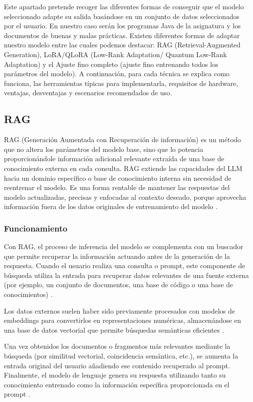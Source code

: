 Este apartado pretende recoger las diferentes formas de conseguir que el modelo seleccionado adapte su salida basándose en un conjunto de datos seleccionados por el usuario. En nuestro caso serán los programas Java de la asignatura y los documentos de buenas y malas prácticas. Existen diferentes formas de adaptar nuestro modelo entre las cuales podemos destacar:  RAG (Retrieval-Augmented Generation), LoRA/QLoRA (Low-Rank Adaptation/ Quantum  Low-Rank Adaptation) y el Ajuste fino completo (ajuste fino entrenando todos los parámetros del modelo). A continuación, para cada técnica se explica como  funciona, las herramientas típicas para implementarla, requisitos de hardware, ventajas, desventajas y escenarios recomendados de uso.

\subsection{RAG}
RAG (Generación Aumentada con Recuperación de información) es un método que no altera los parámetros del modelo base, sino que lo potencia proporcionándole información adicional relevante extraída de una base de conocimiento externa en cada consulta. RAG extiende las capacidades del LLM hacia un dominio específico o base de conocimiento interna sin necesidad de reentrenar el modelo. Es una forma rentable de mantener las respuestas del modelo actualizadas, precisas y enfocadas al contexto deseado, porque aprovecha información fuera de los datos originales de entrenamiento del modelo \cite{RAG-Amazon}.

\subsubsection{Funcionamiento}
Con RAG, el proceso de inferencia del modelo se complementa con un buscador que permite recuperar la información actuando antes de la generación de la respuesta. Cuando el usuario realiza una consulta o prompt, este componente de búsqueda utiliza la entrada para recuperar datos relevantes de una fuente externa (por ejemplo, un conjunto de documentos, una base de código o una base de conocimientos) \cite{RAG-Amazon}.

Los datos externos suelen haber sido previamente procesados con modelos de embeddings para convertirlos en representaciones numéricas, almacenándose en una base de datos vectorial que permite búsquedas semánticas eficientes \cite{RAG-Amazon}.

Una vez obtenidos los documentos o fragmentos más relevantes mediante la búsqueda (por similitud vectorial, coincidencia semántica, etc.), se aumenta la entrada original del usuario añadiendo ese contenido recuperado al prompt. Finalmente, el modelo de lenguaje genera su respuesta utilizando tanto su conocimiento entrenado como la información específica proporcionada en el prompt \cite{RAG-Amazon}.

